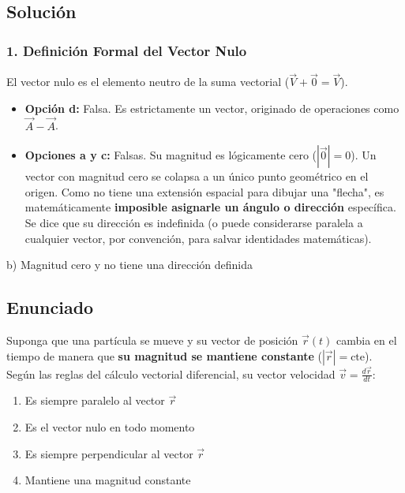 \documentclass[12pt, a4paper]{article}
\begin{document}
\subsection*{Solución}

\subsubsection*{1. Definición Formal del Vector Nulo}
El vector nulo es el elemento neutro de la suma vectorial ($\vec{V} + \vec{0} = \vec{V}$).
\begin{itemize}
    \item \textbf{Opción d:} Falsa. Es estrictamente un vector, originado de operaciones como $\vec{A} - \vec{A}$.
    \item \textbf{Opciones a y c:} Falsas. Su magnitud es lógicamente cero ($|\vec{0}| = 0$). Un vector con magnitud cero se colapsa a un único punto geométrico en el origen. Como no tiene una extensión espacial para dibujar una "flecha", es matemáticamente \textbf{imposible asignarle un ángulo o dirección} específica. Se dice que su dirección es indefinida (o puede considerarse paralela a cualquier vector, por convención, para salvar identidades matemáticas).
\end{itemize}

\begin{tcolorbox}[colback=green!5!white, colframe=green!50!black, title=Respuesta Final]
\centering \Large b) Magnitud cero y no tiene una dirección definida
\end{tcolorbox}

\newpage


\subsection*{Enunciado}
Suponga que una partícula se mueve y su vector de posición $\vec{r}(t)$ cambia en el tiempo de manera que \textbf{su magnitud se mantiene constante} ($|\vec{r}| = \text{cte}$). Según las reglas del cálculo vectorial diferencial, su vector velocidad $\vec{v} = \frac{d\vec{r}}{dt}$:
\begin{enumerate}[label=\alph*)]
    \item Es siempre paralelo al vector $\vec{r}$
    \item Es el vector nulo en todo momento
    \item Es siempre perpendicular al vector $\vec{r}$
    \item Mantiene una magnitud constante
\end{enumerate}
\end{document}
